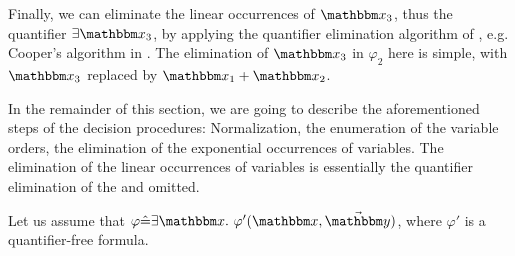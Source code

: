 Finally, we can eliminate the linear occurrences of $\ivarx_3$, thus the quantifier $\exists \ivarx_3$, by applying the quantifier elimination algorithm of {\pa}, e.g. Cooper's algorithm in \cite{Cooper72}. The elimination of $\ivarx_3$ in $\varphi_2$ here is simple, with $\ivarx_3$ replaced by $\ivarx_1 + \ivarx_2$. 

In the remainder of this section, we are going to describe the aforementioned steps of the decision procedures: Normalization, the enumeration of the variable orders, 
the elimination of the exponential occurrences of variables. The elimination of the  linear occurrences of variables is essentially the quantifier elimination of the {\pa} and omitted.

Let us assume that $\varphi \Def \exists \ivarx.\ \varphi'(\ivarx, \vec{\ivary})$, where $\varphi'$ is a quantifier-free formula. 


